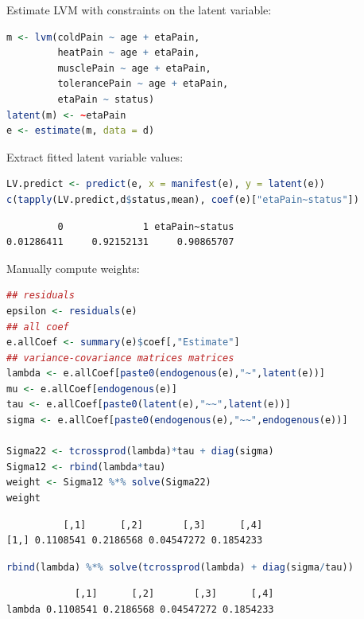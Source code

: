 \documentclass{article}
\begin{document}
Estimate LVM with constraints on the latent variable:
\begin{lstlisting}[language=r,numbers=none]
m <- lvm(coldPain ~ age + etaPain,
         heatPain ~ age + etaPain,
         musclePain ~ age + etaPain,
         tolerancePain ~ age + etaPain,
         etaPain ~ status)
latent(m) <- ~etaPain
e <- estimate(m, data = d)
\end{lstlisting}

Extract fitted latent variable values:
\begin{lstlisting}[language=r,numbers=none]
LV.predict <- predict(e, x = manifest(e), y = latent(e))
c(tapply(LV.predict,d$status,mean), coef(e)["etaPain~status"])
\end{lstlisting}

\label{}
\begin{verbatim}
         0              1 etaPain~status 
0.01286411     0.92152131     0.90865707
\end{verbatim}


\clearpage

Manually compute weights: 
\begin{lstlisting}[language=r,numbers=none]
## residuals
epsilon <- residuals(e) 
## all coef
e.allCoef <- summary(e)$coef[,"Estimate"]
## variance-covariance matrices matrices
lambda <- e.allCoef[paste0(endogenous(e),"~",latent(e))]
mu <- e.allCoef[endogenous(e)]
tau <- e.allCoef[paste0(latent(e),"~~",latent(e))]
sigma <- e.allCoef[paste0(endogenous(e),"~~",endogenous(e))]

Sigma22 <- tcrossprod(lambda)*tau + diag(sigma)
Sigma12 <- rbind(lambda*tau)
weight <- Sigma12 %*% solve(Sigma22)
weight
\end{lstlisting}

\label{}
\begin{verbatim}
          [,1]      [,2]       [,3]      [,4]
[1,] 0.1108541 0.2186568 0.04547272 0.1854233
\end{verbatim}


\begin{lstlisting}[language=r,numbers=none]
rbind(lambda) %*% solve(tcrossprod(lambda) + diag(sigma/tau))
\end{lstlisting}

\label{}
\begin{verbatim}
            [,1]      [,2]       [,3]      [,4]
lambda 0.1108541 0.2186568 0.04547272 0.1854233
\end{verbatim}
\end{document}

